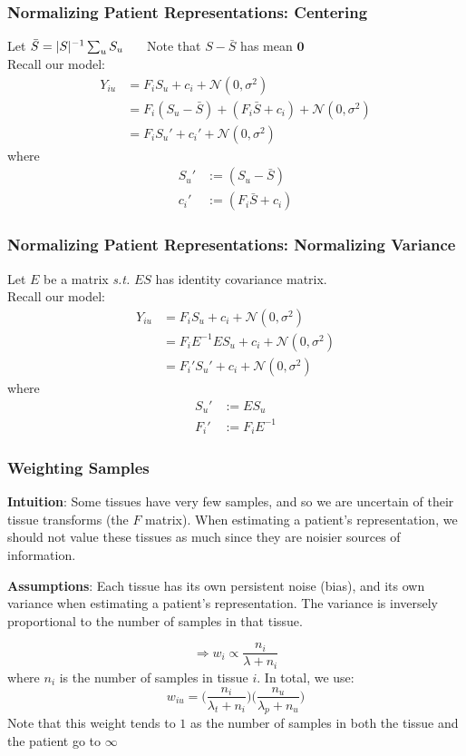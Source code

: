 \documentclass{beamer}
\newcommand{\hs}[1]{\hspace*{#1 cm}}
\begin{document}
\begin{frame} \frametitle{Normalizing Patient Representations: Centering}
Let $\bar{S} = |S|^{-1}\sum_{u} S_u \hs{.5}$ Note that $S-\bar{S}$ has mean $\mathbf{0}$\\
Recall our model:
\begin{align*}
Y_{iu} &= F_i S_u + c_i + \mathcal{N}(0, \sigma^2)
\\&= F_i (S_u - \bar{S}) + (F_i \bar{S} + c_i) + \mathcal{N}(0, \sigma^2)
\\&= F_i S_u' + c_i' + \mathcal{N}(0, \sigma^2)
\end{align*}
where
\begin{align*}
S_u' &:= (S_u - \bar{S}) \\
c_i' &:= (F_i\bar{S} + c_i)
\end{align*}
\end{frame}

\begin{frame} \frametitle{Normalizing Patient Representations: Normalizing Variance}
Let $E$ be a matrix {\it s.t.} $ES$ has identity covariance matrix. \\
Recall our model:
\begin{align*}
Y_{iu} &= F_i S_u + c_i + \mathcal{N}(0, \sigma^2)
\\&= F_i E^{-1} E S_u + c_i + \mathcal{N}(0, \sigma^2)
\\&= F_i'S_u' + c_i + \mathcal{N}(0, \sigma^2)
\end{align*}
where
\begin{align*}
S_u' &:= ES_u \\
F_i' &:= F_iE^{-1}
\end{align*}
\end{frame}

\begin{frame} \frametitle{Weighting Samples}

{\bf Intuition}: Some tissues have very few samples, and so we are uncertain of their tissue transforms (the $F$ matrix). When estimating a patient's representation, we should not value these tissues as much since they are noisier sources of information.

{\bf Assumptions}: Each tissue has its own persistent noise (bias), and its own variance when estimating a patient's representation. The variance is inversely proportional to the number of samples in that tissue.

\[ \Rightarrow w_i \propto \frac{n_i}{\lambda + n_i} \]
where $n_i$ is the number of samples in tissue $i$. In total, we use:
\[ w_{iu} = \big(\frac{n_i}{\lambda_t+n_i}\big)\big(\frac{n_u}{\lambda_p+n_u}\big) \]
Note that this weight tends to $1$ as the number of samples in both the tissue and the patient go to $\infty$
\end{frame}
\end{document}
